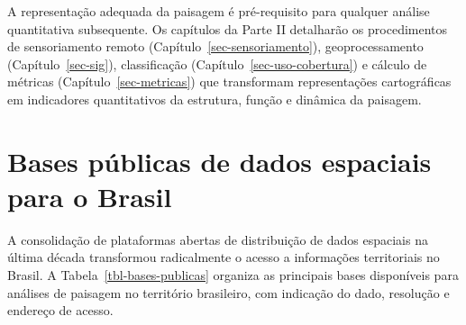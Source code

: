 \documentclass[
  portuguese,
  11pt,
  a4paper,
  open=any]{scrbook}
\begin{document}
A representação adequada da paisagem é pré-requisito para qualquer
análise quantitativa subsequente. Os capítulos da Parte II detalharão os
procedimentos de sensoriamento remoto
(Capítulo~\ref{sec-sensoriamento}), geoprocessamento
(Capítulo~\ref{sec-sig}), classificação
(Capítulo~\ref{sec-uso-cobertura}) e cálculo de métricas
(Capítulo~\ref{sec-metricas}) que transformam representações
cartográficas em indicadores quantitativos da estrutura, função e
dinâmica da paisagem.

\section{Bases públicas de dados espaciais para o
Brasil}\label{bases-puxfablicas-de-dados-espaciais-para-o-brasil}

A consolidação de plataformas abertas de distribuição de dados espaciais
na última década transformou radicalmente o acesso a informações
territoriais no Brasil. A Tabela~\ref{tbl-bases-publicas} organiza as
principais bases disponíveis para análises de paisagem no território
brasileiro, com indicação do dado, resolução e endereço de acesso.
\end{document}
